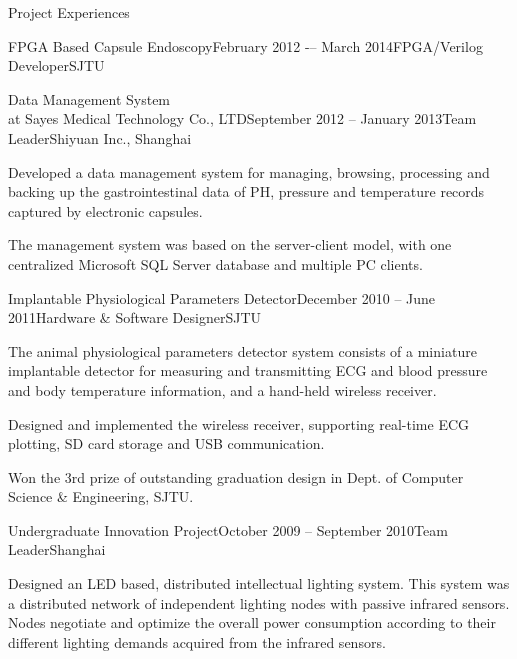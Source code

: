 \documentclass{resume} %
\begin{document}
\begin{rSection}{Project Experiences}
\begin{rSubsection}{FPGA Based Capsule Endoscopy}{February 2012 -– March 2014}{FPGA/Verilog Developer}{SJTU}
    \end{rSubsection}

    \begin{rSubsection}{Data Management System\\ at Sayes Medical Technology Co., LTD}{September 2012 -- January 2013}{Team Leader}{Shiyuan Inc., Shanghai}

    \item Developed a data management system for managing, browsing, processing
        and backing up the gastrointestinal data of PH, pressure and
        temperature records captured by electronic capsules.

    \item The management system was based on the server-client model, with one
        centralized Microsoft SQL Server database and multiple PC clients.

    \end{rSubsection}

    \begin{rSubsection}{Implantable Physiological Parameters Detector}{December 2010 -- June 2011}{Hardware \& Software Designer}{SJTU}

    \item The animal physiological parameters detector system consists of a
        miniature implantable detector for measuring and transmitting ECG and
        blood pressure and body temperature information, and a hand-held
        wireless receiver.

    \item Designed and implemented the wireless receiver, supporting real-time
        ECG plotting, SD card storage and USB communication.

    \item Won the 3rd prize of outstanding graduation design in Dept. of Computer
        Science \& Engineering, SJTU.

    \end{rSubsection}

    \begin{rSubsection}{Undergraduate Innovation Project}{October 2009 -- September 2010}{Team Leader}{Shanghai}

    \item Designed an LED based, distributed intellectual lighting system. This
        system was a distributed network of independent lighting nodes with
        passive infrared sensors. Nodes negotiate and optimize the overall
        power consumption according to their different lighting demands
        acquired from the infrared sensors.


\end{rSubsection}
\end{rSection}
\end{document}
